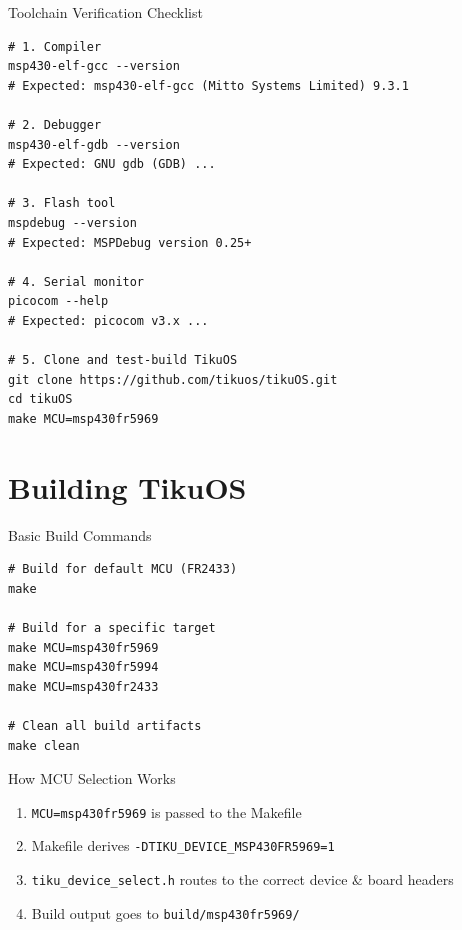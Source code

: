 \documentclass[aspectratio=169, 10pt]{beamer}
\begin{document}
\begin{frame}[fragile]{Toolchain Verification Checklist}
\begin{lstlisting}[style=bashstyle]
# 1. Compiler
msp430-elf-gcc --version
# Expected: msp430-elf-gcc (Mitto Systems Limited) 9.3.1

# 2. Debugger
msp430-elf-gdb --version
# Expected: GNU gdb (GDB) ...

# 3. Flash tool
mspdebug --version
# Expected: MSPDebug version 0.25+

# 4. Serial monitor
picocom --help
# Expected: picocom v3.x ...

# 5. Clone and test-build TikuOS
git clone https://github.com/tikuos/tikuOS.git
cd tikuOS
make MCU=msp430fr5969
\end{lstlisting}
\end{frame}

\section{Building TikuOS}

\begin{frame}[fragile]{Basic Build Commands}
\begin{lstlisting}[style=makestyle]
# Build for default MCU (FR2433)
make

# Build for a specific target
make MCU=msp430fr5969
make MCU=msp430fr5994
make MCU=msp430fr2433

# Clean all build artifacts
make clean
\end{lstlisting}

\vspace{0.3em}
\begin{block}{How MCU Selection Works}
\begin{enumerate}
  \item \texttt{MCU=msp430fr5969} is passed to the Makefile
  \item Makefile derives \texttt{-DTIKU\_DEVICE\_MSP430FR5969=1}
  \item \texttt{tiku\_device\_select.h} routes to the correct device \& board headers
  \item Build output goes to \texttt{build/msp430fr5969/}
\end{enumerate}
\end{block}
\end{frame}
\end{document}
